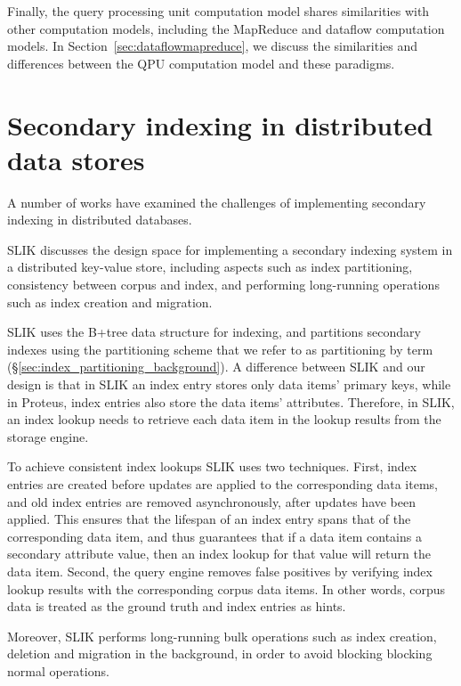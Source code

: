 Finally, the query processing unit computation model shares similarities with other computation models,
including the MapReduce and dataflow computation models.
In Section~\ref{sec:dataflowmapreduce},
we discuss the similarities and differences between the QPU computation model and these paradigms.


\section{Secondary indexing in distributed data stores}
\label{sec:secondaryindexing}

A number of works \cite{kejriwal:slik, dsilva:tworings, tan:diffindex, tang:deferredindexing}
have examined the challenges of implementing secondary indexing in distributed databases.

SLIK \cite{kejriwal:slik} discusses the design space for implementing a secondary indexing system in a distributed key-value store,
including aspects such as index partitioning, consistency between corpus and index,
and performing long-running operations such as index creation and migration.

SLIK uses the B+tree data structure for indexing,
and partitions secondary indexes using the partitioning scheme that we refer to as partitioning by term (\S\ref{sec:index_partitioning_background}).
A difference between SLIK and our design is that in SLIK an index entry stores only data items' primary keys,
while in Proteus, index entries also store the data items' attributes.
Therefore, in SLIK, an index lookup needs to retrieve each data item in the lookup results from the storage engine.

To achieve consistent index lookups SLIK uses two techniques.
First, index entries are created before updates are applied to the corresponding data items,
and old index entries are removed asynchronously, after updates have been applied.
This ensures that the lifespan of an index entry spans that of the corresponding data item,
and thus guarantees that if a data item contains a secondary attribute value, then an index lookup for that value will
return the data item.
Second, the query engine removes false positives by verifying index lookup results with the corresponding corpus data items.
In other words, corpus data is treated as the ground truth and index entries as hints.

Moreover, SLIK performs long-running bulk operations such as index creation, deletion and migration in the background,
in order to avoid blocking blocking normal operations.

